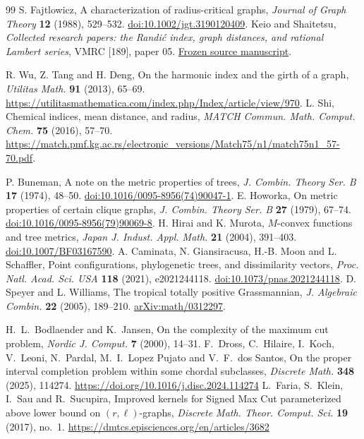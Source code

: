 \documentclass[11pt,a4paper]{article}
\begin{document}
\begin{thebibliography}{99}
 S. Fajtlowicz, A characterization of radius-critical graphs, \emph{Journal of Graph Theory} \textbf{12} (1988), 529--532. \href{https://doi.org/10.1002/jgt.3190120409}{doi:10.1002/jgt.3190120409}.
 Keio and Shaitetsu, \emph{Collected research papers: the Randi\'c index, graph distances, and rational Lambert series}, VMRC [189], paper 05. \href{https://github.com/QEEDDD/Verifiable-Mathematical-Reasoning-Corpus/blob/884d261108a87d2229e5bcc273e5f4a607c771d2/\%5B189\%5D\%20Collected_Research_Papers.tex}{Frozen source manuscript}.

 R. Wu, Z. Tang and H. Deng, On the harmonic index and the girth of a graph, \emph{Utilitas Math.} \textbf{91} (2013), 65--69. \url{https://utilitasmathematica.com/index.php/Index/article/view/970}.
 L. Shi, Chemical indices, mean distance, and radius, \emph{MATCH Commun. Math. Comput. Chem.} \textbf{75} (2016), 57--70. \url{https://match.pmf.kg.ac.rs/electronic_versions/Match75/n1/match75n1_57-70.pdf}.

P. Buneman, A note on the metric properties of trees,
\emph{J. Combin. Theory Ser. B} \textbf{17} (1974), 48--50.
\href{https://doi.org/10.1016/0095-8956(74)90047-1}{doi:10.1016/0095-8956(74)90047-1}.
E. Howorka, On metric properties of certain clique graphs,
\emph{J. Combin. Theory Ser. B} \textbf{27} (1979), 67--74.
\href{https://doi.org/10.1016/0095-8956(79)90069-8}{doi:10.1016/0095-8956(79)90069-8}.
H. Hirai and K. Murota, $M$-convex functions and tree metrics,
\emph{Japan J. Indust. Appl. Math.} \textbf{21} (2004), 391--403.
\href{https://doi.org/10.1007/BF03167590}{doi:10.1007/BF03167590}.
A. Caminata, N. Giansiracusa, H.-B. Moon and L. Schaffler,
Point configurations, phylogenetic trees, and dissimilarity vectors,
\emph{Proc. Natl. Acad. Sci. USA} \textbf{118} (2021), e2021244118.
\href{https://doi.org/10.1073/pnas.2021244118}{doi:10.1073/pnas.2021244118}.
D. Speyer and L. Williams, The tropical totally positive Grassmannian,
\emph{J. Algebraic Combin.} \textbf{22} (2005), 189--210.
\href{https://arxiv.org/abs/math/0312297}{arXiv:math/0312297}.

 H.~L.~Bodlaender and K.~Jansen, On the complexity of the maximum cut problem, \emph{Nordic J. Comput.} \textbf{7} (2000), 14--31.
 F.~Dross, C.~Hilaire, I.~Koch, V.~Leoni, N.~Pardal, M.~I.~Lopez Pujato and V.~F.~dos Santos, On the proper interval completion problem within some chordal subclasses, \emph{Discrete Math.} \textbf{348} (2025), 114274. \url{https://doi.org/10.1016/j.disc.2024.114274}
 L.~Faria, S.~Klein, I.~Sau and R.~Sucupira, Improved kernels for Signed Max Cut parameterized above lower bound on $(r,\ell)$-graphs, \emph{Discrete Math. Theor. Comput. Sci.} \textbf{19} (2017), no.~1. \url{https://dmtcs.episciences.org/en/articles/3682}

\end{thebibliography}
\end{document}
